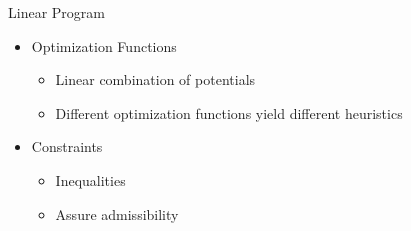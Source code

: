 \documentclass[aspectratio=169, xcolor=dvipsnames]{beamer}
\begin{document}
    \begin{frame}[c]{Linear Program}
        \begin{itemize}
            \item Optimization Functions
            \begin{itemize}
                \item Linear combination of potentials
                \item Different optimization functions yield different heuristics
            \end{itemize}
            \item Constraints
            \begin{itemize}
                \item Inequalities
                \item Assure admissibility
            \end{itemize}
        \end{itemize}
    \end{frame}
\end{document}
